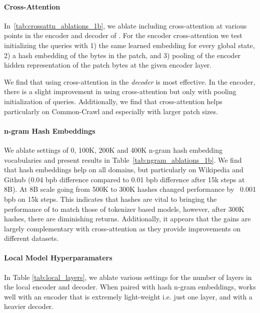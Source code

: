 \documentclass[]{fairmeta}
\begin{document}





\paragraph{Cross-Attention} 
In~\autoref{tab:crossattn_ablations_1b}, we ablate including cross-attention at various points in the encoder and decoder of \model{}. 
For the encoder cross-attention we test initializing the queries with 1) the same learned embedding for every global state, 2) a hash embedding of the bytes in the patch, and 3) pooling of the encoder hidden representation of the patch bytes at the given encoder layer.


We find that using cross-attention in the \textit{decoder} is most effective. In the encoder, there is a slight improvement in using cross-attention but only with pooling initialization of queries. Additionally, we find that cross-attention helps particularly on Common-Crawl and especially with larger patch sizes.





\paragraph{n-gram Hash Embeddings} 

We ablate settings of 0, 100K, 200K and 400K n-gram hash embedding vocabularies and present results in Table~\ref{tab:ngram_ablations_1b}. We find that hash embeddings help on all domains, but particularly on Wikipedia and Github (0.04 bpb difference compared to 0.01 bpb difference after 15k steps at 8B).
At 8B scale going from 500K to 300K hashes changed performance by ~0.001 bpb on 15k steps. This indicates that hashes are vital to bringing the performance of \model{} to match those of tokenizer based models, however, after 300K hashes, there are diminishing returns. Additionally, it appears that the gains are largely complementary with cross-attention as they provide improvements on different datasets.








\paragraph{Local Model Hyperparamaters} 
In Table \ref{tab:local_layers}, we ablate various settings for the number of layers in the local encoder and decoder. When paired with hash n-gram embeddings, \model{} works well with an encoder that is extremely light-weight i.e. just one layer, and with a heavier decoder.
\end{document}
